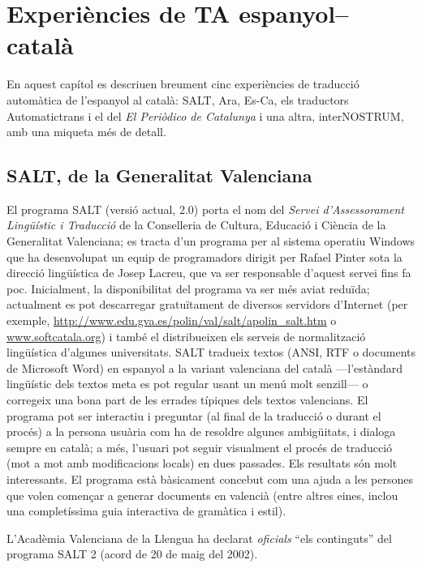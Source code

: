 \chapter{Experiències de TA espanyol--català}
\label{se:ETACC}

En aquest capítol es descriuen breument cinc experiències de traducció
automàtica de l'espanyol al català: SALT, Ara, Es-Ca, els traductors
Automatictrans i el del \textit{El Periòdico de Catalunya} i una
altra, interNOSTRUM, amb una miqueta més de detall.

\section{SALT, de la Generalitat Valenciana}


El programa SALT (versió actual, 2.0) porta el nom del \emph{Servei d'Assessorament
  Lingüístic i Traducció} de la Conselleria de Cultura, Educació i
Ciència de la Generalitat Valenciana; es tracta d'un programa per al
sistema operatiu Windows que ha desenvolupat un equip de programadors
dirigit per Rafael Pinter sota la direcció lingüística de Josep
Lacreu, que va ser responsable d'aquest servei fins fa poc.
Inicialment, la disponibilitat del programa va ser més aviat reduïda;
actualment es pot descarregar gratuïtament de diversos servidors
d'Internet (per exemple,
\url{http://www.edu.gva.es/polin/val/salt/apolin_salt.htm}
o \url{www.softcatala.org}) i també el distribueixen els serveis
de normalització lingüística d'algunes universitats.  SALT tradueix
textos (ANSI, RTF o documents de Microsoft Word) en espanyol a la
variant valenciana del català ---l'estàndard lingüístic dels textos
meta es pot regular usant un menú molt senzill--- o corregeix una bona
part de les errades típiques dels textos valencians. El programa pot
ser interactiu i preguntar (al final de la traducció o durant el
procés) a la persona usuària com ha de resoldre algunes ambigüitats, i
dialoga sempre en català; a més, l'usuari pot seguir visualment el
procés de traducció (mot a mot amb modificacions locals) en dues
passades. Els resultats són molt interessants. El programa està
bàsicament concebut com una ajuda a les persones que volen
començar a generar documents en valencià (entre altres eines,
inclou una completíssima guia interactiva de gramàtica i estil).

L'Acadèmia Valenciana de la Llengua ha declarat \emph{oficials} ``els
continguts'' del programa SALT 2 (acord de 20 de maig del 2002).

